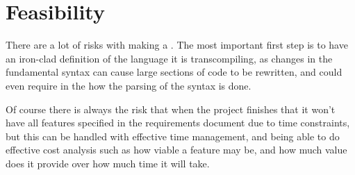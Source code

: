 \newpage


\section{Feasibility}
There are a lot of risks with making a \compiler{}. The most important first step is to have
an iron-clad definition of the language it is transcompiling, as changes in the fundamental syntax
can cause large sections of code to be rewritten, and could even require in the how the parsing of
the syntax is done.


Of course there is always the risk that when the project finishes that it won't have all
features specified in the requirements document due to time constraints, but this can be handled with
effective time management, and being able to do effective cost analysis such as how viable a feature
may be, and how much value does it provide over how much time it will take.